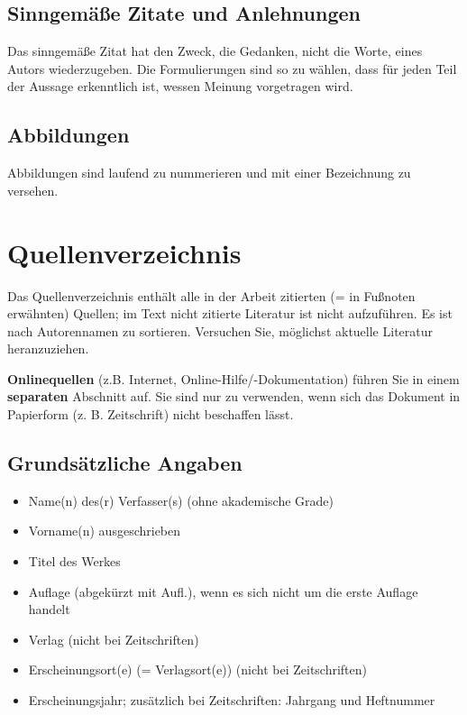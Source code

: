 \subsection{Sinngemäße Zitate und Anlehnungen}
Das sinngemäße Zitat hat den Zweck, die Gedanken, nicht die Worte, eines Autors wiederzugeben. Die Formulierungen sind so zu wählen, dass für jeden Teil der Aussage erkenntlich ist, wessen Meinung vorgetragen wird. 

\subsection{Abbildungen}

Abbildungen sind laufend zu nummerieren und mit einer Bezeichnung zu versehen. 

\section{Quellenverzeichnis}

Das Quellenverzeichnis enthält alle in der Arbeit zitierten (= in Fußnoten erwähnten) Quellen; im Text nicht zitierte Literatur ist nicht aufzuführen. Es ist nach Autorennamen zu sortieren. Versuchen Sie, möglichst aktuelle Literatur heranzuziehen. 

\textbf{Onlinequellen} (z.B. Internet, Online-Hilfe/-Dokumentation) führen Sie in einem \textbf{separaten} Abschnitt auf. Sie sind nur zu verwenden, wenn sich das Dokument in Papierform (z. B. Zeitschrift) nicht beschaffen lässt. 

\subsection{Grundsätzliche Angaben}
\begin{itemize}
	\item Name(n) des(r) Verfasser(s) (ohne akademische Grade)
	\item Vorname(n) ausgeschrieben 
	\item Titel des Werkes 
	\item Auflage (abgekürzt mit \glqq Aufl.\grqq), wenn es sich nicht um die erste Auflage handelt 
	\item Verlag (nicht bei Zeitschriften) 
	\item Erscheinungsort(e) (= Verlagsort(e)) (nicht bei Zeitschriften) 
	\item Erscheinungsjahr; zusätzlich bei Zeitschriften: Jahrgang und Heftnummer 
\end{itemize}

